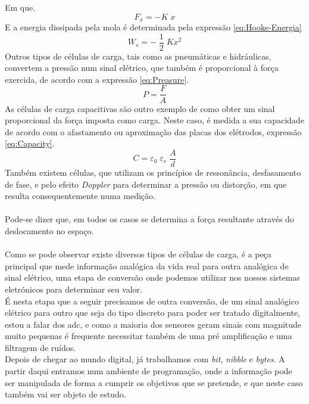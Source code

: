 Em que.
\begin{equation}
	\label{eq:Lei-de-Hooke}
	F_x = -K \; x
\end{equation}
E a energia dissipada pela mola é determinada pela expressão \ref{eq:Hooke-Energia}
\begin{equation}
	\label{eq:Hooke-Energia}
	W_s = - \; \frac{1}{2} \; K x^2
\end{equation}
Outros tipos de células de carga, tais como as pneumáticas e hidráulicas, convertem a pressão num sinal elétrico, que também é proporcional à força exercida, de acordo com a expressão \ref{eq:Preasure}.
\begin{equation}
	\label{eq:Preasure}
	P = \frac{F}{A}
\end{equation}
As células de carga capacitivas são outro exemplo de como obter um sinal proporcional da força imposta como carga. Neste caso, é medida a sua capacidade de acordo com o afastamento ou aproximação das placas dos elétrodos, expressão \ref{eq:Capacity}.
\begin{equation}
	\label{eq:Capacity}
	C = \varepsilon_{0} \; \varepsilon_{r} \; \frac{A}{d}
\end{equation}
Também existem células, que utilizam os princípios de ressonância, desfasamento de fase, e pelo efeito \textit{Doppler} para determinar a pressão ou distorção, em que resulta consequentemente numa medição.
\\
\\
Pode-se dizer que, em todos os casos se determina a força resultante através do deslocamento no espaço.
\\
\\
Como se pode observar existe diversos tipos de células de carga, é a peça principal que mede informação analógica da vida real para outra analógica de sinal elétrico, uma etapa de conversão onde podemos utilizar nos nossos sistemas eletrónicos para determinar seu valor.
\\
É nesta etapa que a seguir precisamos de outra conversão, de um sinal analógico elétrico para outro que seja do tipo discreto para poder ser tratado digitalmente, estou a falar dos \acs{adc}, e como a maioria dos sensores geram sinais com magnitude muito pequenas é frequente necessitar também de uma pré amplificação e uma filtragem de ruídos.
\\
Depois de chegar ao mundo digital, já trabalhamos com \textit{bit}, \textit{nibble} e \textit{bytes}. A partir daqui entramos num ambiente de programação, onde a informação pode ser manipulada de forma a cumprir os objetivos que se pretende, e que neste caso também vai ser objeto de estudo.
